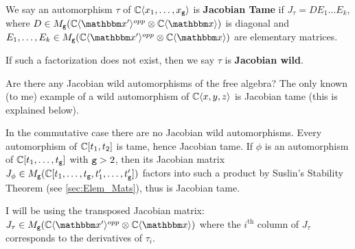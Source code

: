 \begin{definition}
	We say an automorphism $\tau$ of $\mathbb{C}\langle x_1,\dots, x_{\texttt{g}} \rangle$ is \textbf{Jacobian Tame} if
	$J_\tau = DE_1\dots E_k$, where $D\in M_\ttg(\C\fralg{\bbx'}^{opp}\otimes \C\fralg{\bbx})$ is diagonal and
	$E_1,\dots, E_k\in M_\ttg(\C\fralg{\bbx'}^{opp}\otimes \C\fralg{\bbx})$ are elementary matrices.
	
	If such a factorization does not exist, then we say $\tau$ is \textbf{Jacobian wild}.
\end{definition}


\begin{problem}
	Are there any Jacobian wild automorphisms of the free algebra?
	The only known (to me) example of a wild automorphism of $\mathbb{C}\langle x,y,z \rangle$ is Jacobian tame (this is explained below).
	
	In the commutative case there are no Jacobian wild automorphisms.
	Every automorphism of $\mathbb{C}[t_1,t_2]$ is tame, hence Jacobian tame.
	If $\phi$ is an automorphism of $\mathbb{C}[t_1,\dots, t_{\texttt{g}}]$ with ${\texttt{g}}>2$, then its Jacobian matrix
	$J_\phi\in M_{\texttt{g}}(\mathbb{C}[t_1,\dots, t_{\texttt{g}},t_1',\dots,t_{\texttt{g}}'])$ factors into such a product by Suslin's Stability Theorem (see 
	\ref{sec:Elem_Mats}), thus is Jacobian tame.
\end{problem}

I will be using the transposed Jacobian matrix: $J_\tau \in M_\ttg(\C\fralg{\bbx'}^{opp}\otimes \C\fralg{\bbx})$ where the $i^\text{th}$ 
column of $J_\tau$ corresponds to the derivatives of $\tau_i$.


